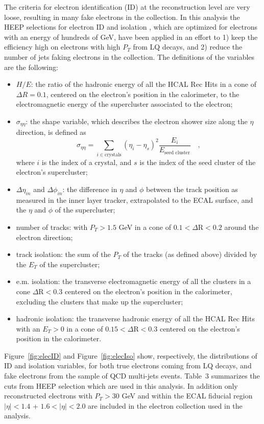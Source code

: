 The criteria for electron identification (ID) at the reconstruction level are very loose, resulting in many fake electrons 
in the collection. In this analysis the HEEP selections for electron ID and isolation \cite{EleID}, which are optimized for 
electrons with an energy of hundreds of GeV, have been applied in an effort to 1) keep the efficiency high on electrons with high $P_{T}$ from LQ decays, and 
2) reduce the number of jets faking electrons in the collection.
The definitions of the variables are the following:
%
\begin{itemize}
%
\item $H/E$: the ratio of the hadronic energy of all the HCAL Rec Hits in a cone of $\Delta R=0.1$, centered on the 
electron's position in the calorimeter, to the electromagnetic energy of the supercluster associated to the electron;
%
\item $\sigma_{\eta\eta}$: the shape variable, which describes the electron shower size along the $\eta$ direction, is 
defined as 
\begin{displaymath}
\sigma_{\eta\eta} = \sum_{i \in \mathrm{crystals}} ( \eta_i - \eta_s )^2 \frac{E_i}{E_{\mbox{seed cluster}}} \quad ,
\end{displaymath}
where $i$ is the index of a crystal, and $s$ is the index of the seed cluster of the electron's supercluster;
%
\item $\Delta\eta_{in}$ and $\Delta\phi_{in}$: the difference in $\eta$ and $\phi$ between the track position as 
measured in the inner layer tracker, extrapolated to the ECAL surface, and the $\eta$ and $\phi$ of the supercluster;
%
\item number of tracks: with $P_{T}>1.5$ GeV in a cone of $0.1 < \Delta\mbox{R} < 0.2 $ around the electron direction;
%
\item track isolation: the sum of the $P_{T}$ of the tracks (as defined above) divided by the $E_{T}$ of the supercluster;
%
\item e.m. isolation: the transverse electromagnetic energy of all the clusters in a cone $\Delta\mbox{R} < 0.3$ centered on the 
electron's position in the calorimeter, excluding the clusters that make up the supercluster;
%
\item hadronic isolation: the transverse hadronic energy of all the HCAL Rec Hits with an $E_{T}>0$ in a cone of
$0.15 < \Delta\mbox{R} < 0.3$ centered on the electron's position in the calorimeter. 
%
\end{itemize}

Figure~\ref{fig:elecID} and Figure~\ref{fig:elecIso} show, respectively, the distributions of ID and isolation variables, 
for both true electrons coming from LQ decays, and fake electrons from the sample of QCD multi-jets events. 
Table~3
summarizes the cuts from HEEP selection which are 
used in this analysis. In addition only reconstructed electrons with $P_{T}>30$ GeV and 
within the ECAL fiducial region 
$|\eta|<1.4$ + $1.6<|\eta|<2.0$ are included in the electron collection used in the analysis.  

